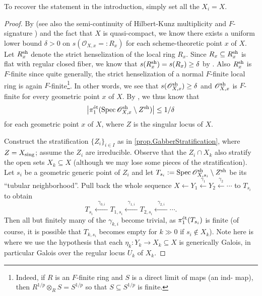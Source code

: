 \documentclass[12pt]{amsart}
\numberwithin{equation}{theorem}
\renewcommand{\:}{\colon}
\theoremstyle{theorem}
\renewcommand{\O}{\mathscr O}
\begin{document}
To recover the statement in the introduction, simply set all the $X_i = X$.

\begin{proof}
By \cite[Theorem B]{deStefaniPolstraYao-Globalizing} (see also the semi-continuity of Hilbert-Kunz multiplicity and $F$-signature \cite{SmirnovUpperSemicontinuity,PolstraSemicontinuityFsignature,TuckerPolstraUniformApproach}) and the fact that $X$ is quasi-compact, we know there exists a uniform lower bound $\delta > 0$ on $s(\O_{X,x} =: R_x)$ for each scheme-theoretic point $x$ of $X$.
Let $R_x^{\textnormal{sh}}$ denote the strict henselization of the local ring $R_x$.
Since $R_x \subseteq R_x^{\textnormal{sh}}$ is flat with regular closed fiber, we know that $s(R_x^{\textnormal{sh}}) = s(R_x) \ge \delta$ by \cite[Theorem 5.6]{YaoObservationsAboutTheFSignature}.
Also $R_x^{\textnormal{sh}}$ is $F$-finite since quite generally, the strict henselization of a normal $F$-finite local ring is again $F$-finite\footnote{Indeed, if $R$ is an $F$-finite ring and $S$ is a direct limit of \etale{} maps (\ie an ind-\etale{} map), then $R^{1/p} \otimes_R S = S^{1/p}$ so that $S \subseteq S^{1/p}$ is finite.}.
In other words, we see that $s(\O_{X,x}^{\sh}) \geq \delta$ and $\O_{X,x}^{\sh}$ is $F$-finite for every geometric point $x$ of $X$.
By \cite[Theorem A]{CarvajalSchwedeTuckerEtaleFundFsignature}, we thus know that
\[
\big|\pi_1^{\et}(\Spec \O_{X,x}^{\sh} \setminus Z^{\sh})\big| \leq 1/\delta
\]
for each geometric point $x$ of $X$, where $Z$ is the singular locus of $X$.

Construct the stratification $\{ Z_i \}_{i \in I}$ as in \autoref{prop.GabberStratification}, where $Z = X_{\operatorname{{sing}}}$; assume the $Z_i$ are irreducible.  Observe that the $Z_i \cap X_k$ also stratify the open sets $X_k \subseteq X$ (although we may lose some pieces of the stratification).
Let $s_i$ be a geometric generic point of $Z_i$ and let $T_{s_i} := \Spec \O_{X, s_i}^{\sh} \setminus Z^{\sh}$ be its ``tubular neighborhood''. Pull back the whole sequence $X \leftarrow Y_1 \xleftarrow{\gamma_1} Y_2 \xleftarrow{\gamma_2} \cdots $ to $T_{s_i}$ to obtain
\[ T_{s_i} \xleftarrow{\;\;\gamma_{0, i}\;\;} T_{1, s_i} \xleftarrow{\;\;\gamma_{1, i}\;\;} T_{2, s_i} \xleftarrow{\;\;\gamma_{2, i}\;\;} \cdots. \]
Then all but finitely many of the $\gamma_{k, i}$ become trivial, as $\pi_1^{\textnormal{{\'e}t}}(T_{s_i})$ is finite (of course, it is possible that $T_{k, s_i}$ becomes empty for $k \gg 0$ if $s_i \notin X_k$).
Note here is where we use the hypothesis that each $\eta_k : Y_k \to X_k \subseteq X$ is generically Galois, in particular Galois over the regular locus $U_k$ of $X_k$.


\end{proof}
\end{document}
